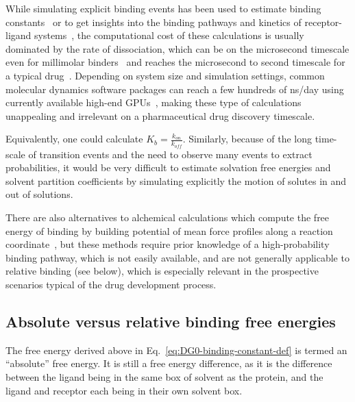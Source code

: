 \documentclass[9pt,bestpractices]{livecoms}
\begin{document}
While simulating explicit binding events has been used to estimate binding constants~\cite{jong2011determining,pan2017quantitative} or to get insights into the binding pathways and kinetics of receptor-ligand systems~\cite{teo2016adaptive,votapka2017seekr,doerr2014onthefly,plattner2015protein,dixon2018predicting}, the computational cost of these calculations is usually dominated by the rate of dissociation, which can be on the microsecond timescale even for millimolar binders~\cite{pan2017quantitative} and reaches the microsecond to second timescale for a typical drug~\cite{basavapathruni2012conformational,hyre2006cooperative}.
Depending on system size and simulation settings, common molecular dynamics software packages can reach a few hundreds of ns/day using currently available high-end GPUs~\cite{eastman2017openmm,kutzner2019more}, making these type of calculations unappealing and irrelevant on a pharmaceutical drug discovery timescale.

Equivalently, one could calculate $K_b = \frac{k_{on}}{k_{off}}$. Similarly, because of the long time-scale of transition events and the need to observe many events to extract probabilities, it would be very difficult to estimate solvation free energies and solvent partition coefficients by simulating explicitly the motion of solutes in and out of solutions.

There are also alternatives to alchemical calculations which compute the free energy of binding by building potential of mean force profiles along a reaction coordinate~\cite{woo2005calculation,velez-vega2013overcoming,limongelli2013funnel,heinzelmann2017attachpullrelease}, but these methods require prior knowledge of a high-probability binding pathway, which is not easily available, and are not generally applicable to relative binding (see below), which is especially relevant in the prospective scenarios typical of the drug development process.

\subsection{Absolute versus relative binding free energies}

The free energy derived above in Eq.~\ref{eq:DG0-binding-constant-def} is termed an ``absolute'' free energy.  It is still a free energy difference, as it is the difference between the ligand being in the same box of solvent as the protein, and the ligand and receptor each being in their own solvent box.
\end{document}

